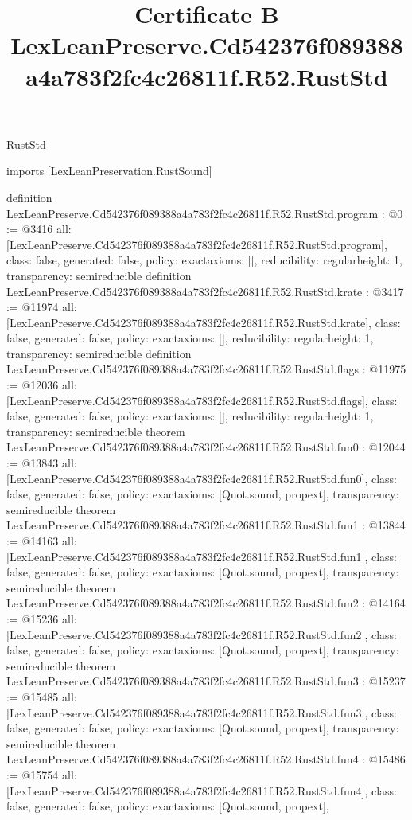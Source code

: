 \begin{lexlean}{RustStd}
\title{Certificate B LexLeanPreserve.Cd542376f089388a4a783f2fc4c26811f.R52.RustStd}
\begin{coremodule}
imports [LexLeanPreservation.RustSound]

definition LexLeanPreserve.Cd542376f089388a4a783f2fc4c26811f.R52.RustStd.program : @0 := @3416 {
  all: [LexLeanPreserve.Cd542376f089388a4a783f2fc4c26811f.R52.RustStd.program],
  class: false,
  generated: false,
  policy: exact{axioms: []},
  reducibility: regular{height: 1},
  transparency: semireducible
}
definition LexLeanPreserve.Cd542376f089388a4a783f2fc4c26811f.R52.RustStd.krate : @3417 := @11974 {
  all: [LexLeanPreserve.Cd542376f089388a4a783f2fc4c26811f.R52.RustStd.krate],
  class: false,
  generated: false,
  policy: exact{axioms: []},
  reducibility: regular{height: 1},
  transparency: semireducible
}
definition LexLeanPreserve.Cd542376f089388a4a783f2fc4c26811f.R52.RustStd.flags : @11975 := @12036 {
  all: [LexLeanPreserve.Cd542376f089388a4a783f2fc4c26811f.R52.RustStd.flags],
  class: false,
  generated: false,
  policy: exact{axioms: []},
  reducibility: regular{height: 1},
  transparency: semireducible
}
theorem LexLeanPreserve.Cd542376f089388a4a783f2fc4c26811f.R52.RustStd.fun0 : @12044 := @13843 {
  all: [LexLeanPreserve.Cd542376f089388a4a783f2fc4c26811f.R52.RustStd.fun0],
  class: false,
  generated: false,
  policy: exact{axioms: [Quot.sound, propext]},
  transparency: semireducible
}
theorem LexLeanPreserve.Cd542376f089388a4a783f2fc4c26811f.R52.RustStd.fun1 : @13844 := @14163 {
  all: [LexLeanPreserve.Cd542376f089388a4a783f2fc4c26811f.R52.RustStd.fun1],
  class: false,
  generated: false,
  policy: exact{axioms: [Quot.sound, propext]},
  transparency: semireducible
}
theorem LexLeanPreserve.Cd542376f089388a4a783f2fc4c26811f.R52.RustStd.fun2 : @14164 := @15236 {
  all: [LexLeanPreserve.Cd542376f089388a4a783f2fc4c26811f.R52.RustStd.fun2],
  class: false,
  generated: false,
  policy: exact{axioms: [Quot.sound, propext]},
  transparency: semireducible
}
theorem LexLeanPreserve.Cd542376f089388a4a783f2fc4c26811f.R52.RustStd.fun3 : @15237 := @15485 {
  all: [LexLeanPreserve.Cd542376f089388a4a783f2fc4c26811f.R52.RustStd.fun3],
  class: false,
  generated: false,
  policy: exact{axioms: [Quot.sound, propext]},
  transparency: semireducible
}
theorem LexLeanPreserve.Cd542376f089388a4a783f2fc4c26811f.R52.RustStd.fun4 : @15486 := @15754 {
  all: [LexLeanPreserve.Cd542376f089388a4a783f2fc4c26811f.R52.RustStd.fun4],
  class: false,
  generated: false,
  policy: exact{axioms: [Quot.sound, propext]},
}
\end{coremodule}
\end{lexlean}
